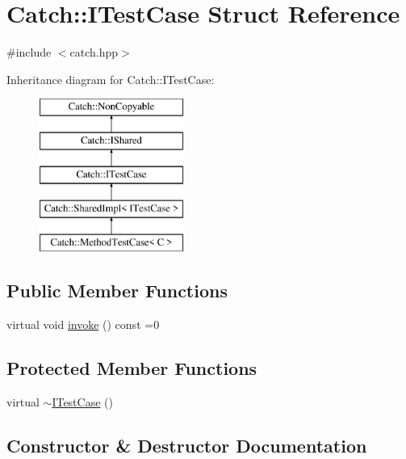 \hypertarget{struct_catch_1_1_i_test_case}{}\section{Catch\+:\+:I\+Test\+Case Struct Reference}
\label{struct_catch_1_1_i_test_case}


{\ttfamily \#include $<$catch.\+hpp$>$}

Inheritance diagram for Catch\+:\+:I\+Test\+Case\+:\begin{figure}[H]
\begin{center}
\leavevmode
\includegraphics[height=5.000000cm]{struct_catch_1_1_i_test_case}
\end{center}
\end{figure}
\subsection*{Public Member Functions}
\begin{DoxyCompactItemize}
\item 
virtual void \mbox{\hyperlink{struct_catch_1_1_i_test_case_a678825e62e7c17297621cfeb65588c34}{invoke}} () const =0
\end{DoxyCompactItemize}
\subsection*{Protected Member Functions}
\begin{DoxyCompactItemize}
\item 
virtual \mbox{\hyperlink{struct_catch_1_1_i_test_case_add7b9bec455ac1b007c17df82144310e}{$\sim$\+I\+Test\+Case}} ()
\end{DoxyCompactItemize}


\subsection{Constructor \& Destructor Documentation}
\mbox{\label{struct_catch_1_1_i_test_case_add7b9bec455ac1b007c17df82144310e}} 
